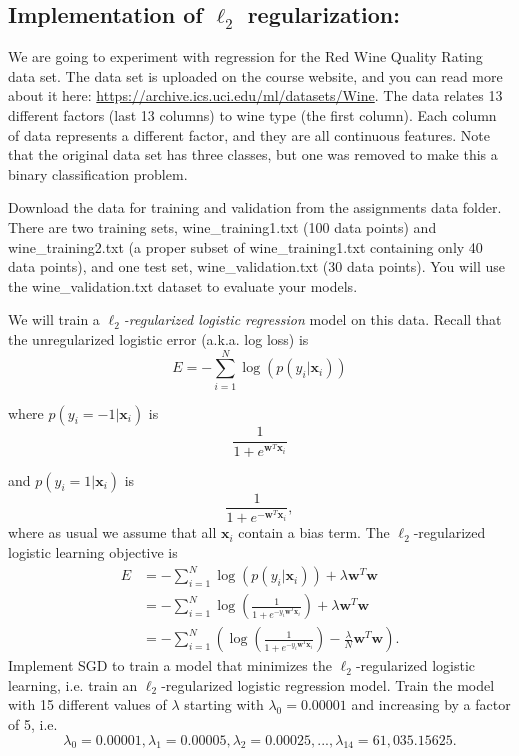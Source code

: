 \documentclass{article}
\newcounter{problem}[section]
\begin{document}
\subsection{Implementation of \texorpdfstring{$\ell_2$}{L2} regularization:}

We are going to experiment with regression for the Red Wine Quality Rating data set. The data set is uploaded on the course website, and you can read more about it here: \url{https://archive.ics.uci.edu/ml/datasets/Wine}. The data relates 13 different factors (last 13 columns) to wine type (the first column). Each column of data represents a different factor, and they are all continuous features. Note that the original data set has three classes, but one was removed to make this a binary classification problem.

Download the data for training and validation from the assignments data folder.
There are two training sets,
wine\_training1.txt (100 data points) and wine\_training2.txt (a proper subset of wine\_training1.txt containing only 40 data points), and one test set, wine\_validation.txt (30 data points). You will use the wine\_validation.txt dataset to evaluate your models.

We will train a \emph{$\ell_2$-regularized logistic regression} model on this data. Recall that the unregularized logistic error (a.k.a. log loss) is
\[E = -\sum_{i=1}^{N}\log(p(y_i | \mathbf{x}_i))\]

where $p(y_i = -1 | \mathbf{x}_i)$ is
\[\frac{1}{1 + e^{\mathbf{w}^T\mathbf{x}_i}}\]

and $p(y_i = 1 | \mathbf{x}_i)$ is
\[\frac{1}{1 + e^{-\mathbf{w}^T\mathbf{x}_i}},\]
where as usual we assume that all $\mathbf{x}_i$ contain a bias term.
The $\ell_2$-regularized logistic learning objective is 
\begin{align*}
  E &= -\sum_{i=1}^{N}\log(p(y_i | \mathbf{x}_i)) + \lambda\mathbf{w}^T\mathbf{w} \\
    &= -\sum_{i=1}^{N} \log \left( \frac{1}{1 + e^{-y_i\mathbf{w}^T\mathbf{x}_i}} \right) + \lambda\mathbf{w}^T\mathbf{w} \\
    &= -\sum_{i=1}^{N} \left(\log \left( \frac{1}{1 + e^{-y_i\mathbf{w}^T\mathbf{x}_i}} \right) - \frac{\lambda}{N}\mathbf{w}^T\mathbf{w}\right).
\end{align*}
Implement SGD to train a model that minimizes the $\ell_2$-regularized logistic learning, i.e. train an $\ell_2$-regularized logistic regression model.  Train the model with 15 different values of $\lambda$ starting with $\lambda_0 = 0.00001$ and increasing by a factor of 5, i.e. $$\lambda_0 = 0.00001, \lambda_1 = 0.00005, \lambda_2 = 0.00025, ..., \lambda_{14} = 61,035.15625.$$
\par
\end{document}
